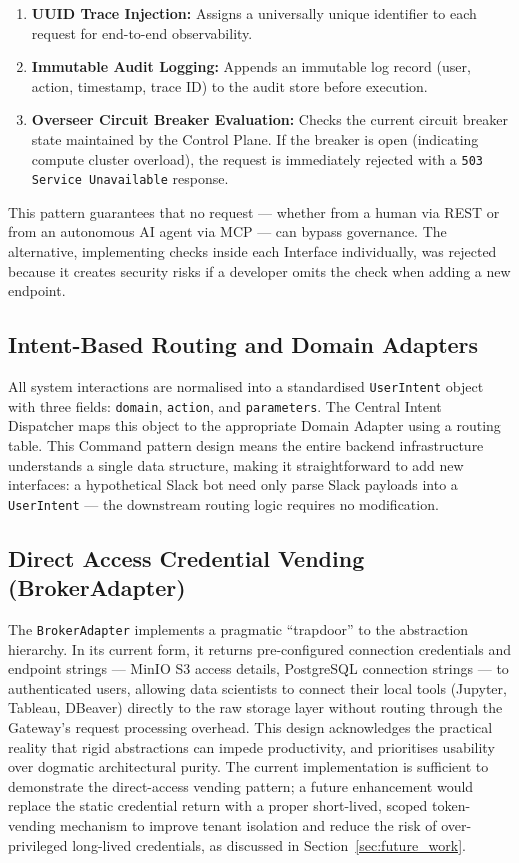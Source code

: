 \documentclass[12pt, a4paper]{report}
\begin{document}
\begin{enumerate}
  \item \textbf{UUID Trace Injection:} Assigns a universally unique identifier to each
  request for end-to-end observability.
  \item \textbf{Immutable Audit Logging:} Appends an immutable log record (user, action,
  timestamp, trace ID) to the audit store before execution.
  \item \textbf{Overseer Circuit Breaker Evaluation:} Checks the current circuit breaker
  state maintained by the Control Plane. If the breaker is open (indicating compute
  cluster overload), the request is immediately rejected with a
  \texttt{503 Service Unavailable} response.
\end{enumerate}

This pattern guarantees that no request — whether from a human via REST or from an
autonomous AI agent via MCP — can bypass governance.
The alternative, implementing checks inside each Interface individually, was rejected
because it creates security risks if a developer omits the check when adding a new
endpoint.

\subsection{Intent-Based Routing and Domain Adapters}
\label{ssec:intent_routing}

All system interactions are normalised into a standardised \texttt{UserIntent} object
with three fields: \texttt{domain}, \texttt{action}, and \texttt{parameters}.
The Central Intent Dispatcher maps this object to the appropriate Domain Adapter using a
routing table.
This Command pattern design means the entire backend infrastructure understands a single
data structure, making it straightforward to add new interfaces: a hypothetical Slack
bot need only parse Slack payloads into a \texttt{UserIntent} — the downstream routing
logic requires no modification.

\subsection{Direct Access Credential Vending (BrokerAdapter)}
\label{ssec:broker}

The \texttt{BrokerAdapter} implements a pragmatic ``trapdoor'' to the abstraction
hierarchy.
In its current form, it returns pre-configured connection credentials and endpoint
strings — MinIO S3 access details, PostgreSQL connection strings — to authenticated
users, allowing data scientists to connect their local tools (Jupyter, Tableau,
DBeaver) directly to the raw storage layer without routing through the Gateway's
request processing overhead.
This design acknowledges the practical reality that rigid abstractions can impede
productivity, and prioritises usability over dogmatic architectural purity.
The current implementation is sufficient to demonstrate the direct-access vending
pattern; a future enhancement would replace the static credential return with a
proper short-lived, scoped token-vending mechanism to improve tenant isolation and
reduce the risk of over-privileged long-lived credentials, as discussed in
Section~\ref{sec:future_work}.
\end{document}
